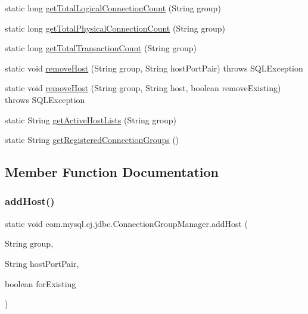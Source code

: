 \begin{DoxyCompactItemize}
\item 
static long \mbox{\hyperlink{classcom_1_1mysql_1_1cj_1_1jdbc_1_1_connection_group_manager_a48f0151dd30ec56cf015009d977a8282}{get\+Total\+Logical\+Connection\+Count}} (String group)
\item 
static long \mbox{\hyperlink{classcom_1_1mysql_1_1cj_1_1jdbc_1_1_connection_group_manager_a6e9647914377f81895d10b5644557e0b}{get\+Total\+Physical\+Connection\+Count}} (String group)
\item 
static long \mbox{\hyperlink{classcom_1_1mysql_1_1cj_1_1jdbc_1_1_connection_group_manager_a784fd9b2f8a7bb8e4fc39e3fe3cf19ec}{get\+Total\+Transaction\+Count}} (String group)
\item 
static void \mbox{\hyperlink{classcom_1_1mysql_1_1cj_1_1jdbc_1_1_connection_group_manager_aac3f0051c40c46f4f9f34672cb05913e}{remove\+Host}} (String group, String host\+Port\+Pair)  throws S\+Q\+L\+Exception 
\item 
static void \mbox{\hyperlink{classcom_1_1mysql_1_1cj_1_1jdbc_1_1_connection_group_manager_a8257aff1c66fad4a7865489467bb8c74}{remove\+Host}} (String group, String host, boolean remove\+Existing)  throws S\+Q\+L\+Exception 
\item 
static String \mbox{\hyperlink{classcom_1_1mysql_1_1cj_1_1jdbc_1_1_connection_group_manager_abe7699bde9cd34608ce5d66090508d0d}{get\+Active\+Host\+Lists}} (String group)
\item 
static String \mbox{\hyperlink{classcom_1_1mysql_1_1cj_1_1jdbc_1_1_connection_group_manager_a49efbc25f7c954fc391cfd9d3657c87c}{get\+Registered\+Connection\+Groups}} ()
\end{DoxyCompactItemize}


\subsection{Member Function Documentation}
\mbox{\label{classcom_1_1mysql_1_1cj_1_1jdbc_1_1_connection_group_manager_a63735dc43c2b4813bf7f9643abd06aad}} 
\subsubsection{\texorpdfstring{add\+Host()}{addHost()}}
{\footnotesize\ttfamily static void com.\+mysql.\+cj.\+jdbc.\+Connection\+Group\+Manager.\+add\+Host (\begin{DoxyParamCaption}\item[{String}]{group,  }\item[{String}]{host\+Port\+Pair,  }\item[{boolean}]{for\+Existing }\end{DoxyParamCaption})\hspace{0.3cm}{\ttfamily [static]}}

